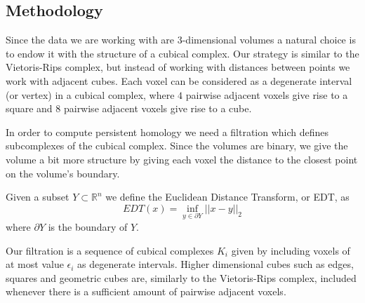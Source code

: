 \subsection{Methodology}
Since the data we are working with are 3-dimensional volumes a natural choice is to endow it with the structure of a cubical complex. Our strategy is similar to the Vietoris-Rips complex, but instead of working with distances between points we work with adjacent cubes. Each voxel can be considered as a degenerate interval (or vertex) in a cubical complex, where $4$ pairwise adjacent voxels give rise to a square and $8$ pairwise adjacent voxels give rise to a cube.

In order to compute persistent homology we need a filtration which defines subcomplexes of the cubical complex. Since the volumes are binary, we give the volume a bit more structure by giving each voxel the distance to the closest point on the volume's boundary.
\begin{definition}
  Given a subset $Y \subset \mathbb{R}^{n}$ we define the Euclidean Distance Transform, or EDT, as
   \[EDT(x) = \inf_{y \in \partial Y} ||x - y||_2\]
   where $\partial Y$ is the boundary of $Y$.
\end{definition}

Our filtration is a sequence of cubical complexes $K_{i}$ given by including voxels of at most value $\epsilon_{i}$ as degenerate intervals. Higher dimensional cubes such as edges, squares and geometric cubes are, similarly to the Vietoris-Rips complex, included whenever there is a sufficient amount of pairwise adjacent voxels.

